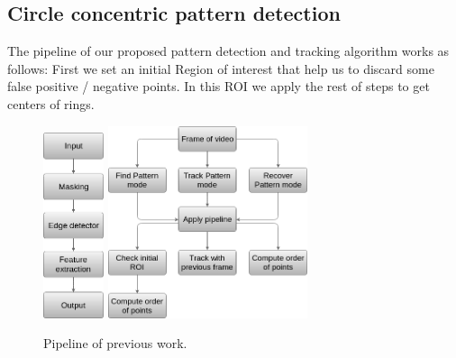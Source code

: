 \documentclass[journal]{IEEEtran}
\begin{document}
\subsection{Circle concentric pattern detection}
The pipeline of our proposed pattern detection and tracking algorithm works as follows: First we set an initial Region of interest that help us to discard some false positive / negative points. In this ROI we apply the rest of steps to get centers of rings.

\begin{figure}[H]
\centering
\includegraphics[width=0.7in]{_img/img_report4_pipeline_detector.png}
\includegraphics[width=2.3in]{_img/img_report4_pipeline_modes.png}
\caption{Pipeline of previous work.}
\end{figure}
\end{document}

